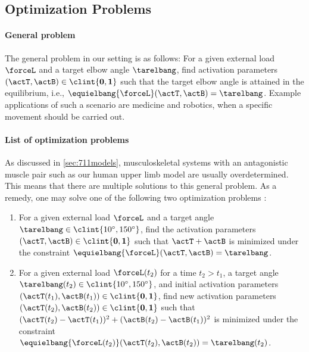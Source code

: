 \subsection{Optimization Problems}
\label{sec:722optimization}

\paragraph{General problem}

The general problem in our setting is as follows:
For a given external load $\forceL$ and a target elbow angle $\tarelbang$,
find activation parameters $(\actT, \actB) \in \clint{\*0, \*1}$
such that the target elbow angle is attained in the equilibrium,
i.e., $\equielbang{\forceL}(\actT,\actB) = \tarelbang$.
Example applications of such a scenario are medicine and robotics,
when a specific movement should be carried out.

\paragraph{List of optimization problems}

As discussed in \cref{sec:711models},
musculoskeletal systems with an antagonistic muscle pair
such as our human upper limb model are usually overdetermined.
This means that there are multiple solutions to this general problem.
As a remedy, one may solve one of the following two
optimization problems \cite{Valentin18Gradient}:

\begin{enumerate}[label=O\arabic*.,ref=O\arabic*,leftmargin=2.7em]
  \item
  \label{item:biomech2MinSum}
  For a given external load $\forceL$ and a target angle
  $\tarelbang \in \clint{\ang{10}, \ang{150}}$,
  find the activation parameters $(\actT, \actB) \in \clint{\*0, \*1}$
  such that $\actT + \actB$ is minimized under the constraint
  $\equielbang{\forceL}(\actT, \actB) = \tarelbang$.
  
  \item
  \label{item:biomech2MinDist}
  For a given external load $\forceL(t_2)$ for a time $t_2 > t_1$,
  a target angle $\tarelbang(t_2) \in \clint{\ang{10}, \ang{150}}$,
  and initial activation parameters
  $(\actT(t_1), \actB(t_1)) \in \clint{\*0, \*1}$,
  find new activation parameters
  $(\actT(t_2), \actB(t_2)) \in \clint{\*0, \*1}$ such that
  $(\actT(t_2) - \actT(t_1))^2 + (\actB(t_2) - \actB(t_1))^2$
  is minimized under the constraint
  $\equielbang{\forceL(t_2)}(\actT(t_2), \actB(t_2)) = \tarelbang(t_2)$.
\end{enumerate}

